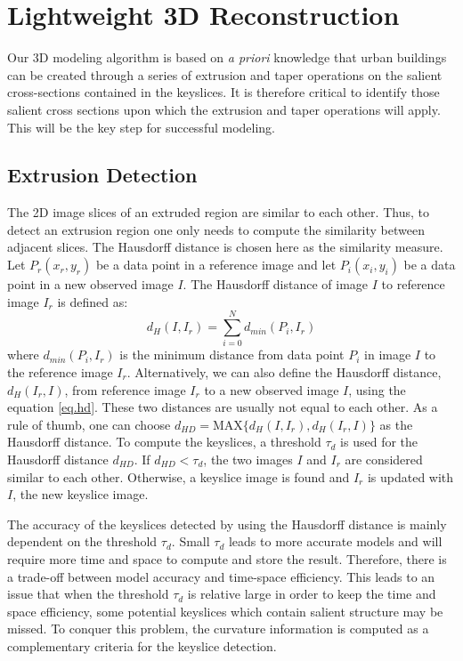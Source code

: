 \documentclass{acmsiggraph}                     %
\begin{document}
\section{Lightweight 3D Reconstruction}
\label{sec:reconst}
Our 3D modeling algorithm is based on \emph{a priori} knowledge that
urban buildings can be created through a series of extrusion and taper
operations on the salient cross-sections contained in the keyslices.
It is therefore critical to identify those salient cross sections upon
which the extrusion and taper operations will apply.
This will be the key step for successful modeling.

\subsection{Extrusion Detection}
\label{sec:ksd}
The 2D image slices of an extruded region are similar to each other.
Thus, to detect an extrusion region one only needs to compute
the similarity between adjacent slices.
The Hausdorff distance is chosen here as the similarity measure.
Let $P_r(x_r, y_r)$ be a data point in a reference image and
let $P_i(x_i, y_i)$ be a data point in a new observed image $I$.
The Hausdorff distance of image $I$ to reference image $I_r$ is defined as:
\begin{equation} \label{eq.hd}
d_H(I, I_r) = \sum_{i=0}^Nd_{min}(P_i, I_r)
\end{equation}
where $d_{min}(P_i, I_r)$ is the minimum distance from data point $P_i$
in image $I$ to the reference image $I_r$.
Alternatively, we can also define the Hausdorff distance, $d_H(I_r, I)$,
from reference image $I_r$ to a new observed image $I$, using the equation \ref{eq.hd}.
These two distances are usually not equal to each other.
As a rule of thumb, one can choose
$d_{HD} = \text{MAX}\{d_H(I, I_r), d_H(I_r, I)\}$ as the Hausdorff distance.
To compute the keyslices, a threshold $\tau_{d}$ is used for the
Hausdorff distance $d_{HD}$.
If $d_{HD} < \tau_{d}$, the two images $I$ and $I_r$ are considered
similar to each other.
Otherwise, a keyslice image is found and $I_r$ is updated with $I$,
the new keyslice image.

The accuracy of the keyslices detected by using the Hausdorff distance
is mainly dependent on the threshold $\tau_d$.
Small $\tau_d$ leads to more accurate models and will require more time and
space to compute and store the result.
Therefore, there is a trade-off between model accuracy and time-space
efficiency.
This leads to an issue that when the threshold $\tau_d$ is relative large
in order to keep the time and space efficiency, some potential keyslices which
contain salient structure may be missed.
To conquer this problem, the curvature information is computed as a complementary
criteria for the keyslice detection.
\end{document}
